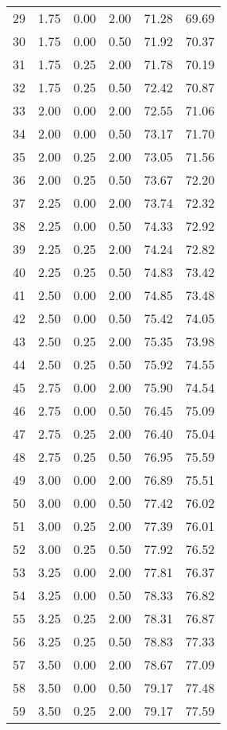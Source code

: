 \begin{tabular}{rrrrrr}
  29 & 1.75 & 0.00 & 2.00 & 71.28 & 69.69 \\ 
  30 & 1.75 & 0.00 & 0.50 & 71.92 & 70.37 \\ 
  31 & 1.75 & 0.25 & 2.00 & 71.78 & 70.19 \\ 
  32 & 1.75 & 0.25 & 0.50 & 72.42 & 70.87 \\ 
  33 & 2.00 & 0.00 & 2.00 & 72.55 & 71.06 \\ 
  34 & 2.00 & 0.00 & 0.50 & 73.17 & 71.70 \\ 
  35 & 2.00 & 0.25 & 2.00 & 73.05 & 71.56 \\ 
  36 & 2.00 & 0.25 & 0.50 & 73.67 & 72.20 \\ 
  37 & 2.25 & 0.00 & 2.00 & 73.74 & 72.32 \\ 
  38 & 2.25 & 0.00 & 0.50 & 74.33 & 72.92 \\ 
  39 & 2.25 & 0.25 & 2.00 & 74.24 & 72.82 \\ 
  40 & 2.25 & 0.25 & 0.50 & 74.83 & 73.42 \\ 
  41 & 2.50 & 0.00 & 2.00 & 74.85 & 73.48 \\ 
  42 & 2.50 & 0.00 & 0.50 & 75.42 & 74.05 \\ 
  43 & 2.50 & 0.25 & 2.00 & 75.35 & 73.98 \\ 
  44 & 2.50 & 0.25 & 0.50 & 75.92 & 74.55 \\ 
  45 & 2.75 & 0.00 & 2.00 & 75.90 & 74.54 \\ 
  46 & 2.75 & 0.00 & 0.50 & 76.45 & 75.09 \\ 
  47 & 2.75 & 0.25 & 2.00 & 76.40 & 75.04 \\ 
  48 & 2.75 & 0.25 & 0.50 & 76.95 & 75.59 \\ 
  49 & 3.00 & 0.00 & 2.00 & 76.89 & 75.51 \\ 
  50 & 3.00 & 0.00 & 0.50 & 77.42 & 76.02 \\ 
  51 & 3.00 & 0.25 & 2.00 & 77.39 & 76.01 \\ 
  52 & 3.00 & 0.25 & 0.50 & 77.92 & 76.52 \\ 
  53 & 3.25 & 0.00 & 2.00 & 77.81 & 76.37 \\ 
  54 & 3.25 & 0.00 & 0.50 & 78.33 & 76.82 \\ 
  55 & 3.25 & 0.25 & 2.00 & 78.31 & 76.87 \\ 
  56 & 3.25 & 0.25 & 0.50 & 78.83 & 77.33 \\ 
  57 & 3.50 & 0.00 & 2.00 & 78.67 & 77.09 \\ 
  58 & 3.50 & 0.00 & 0.50 & 79.17 & 77.48 \\ 
  59 & 3.50 & 0.25 & 2.00 & 79.17 & 77.59 \\ 

\end{tabular}
